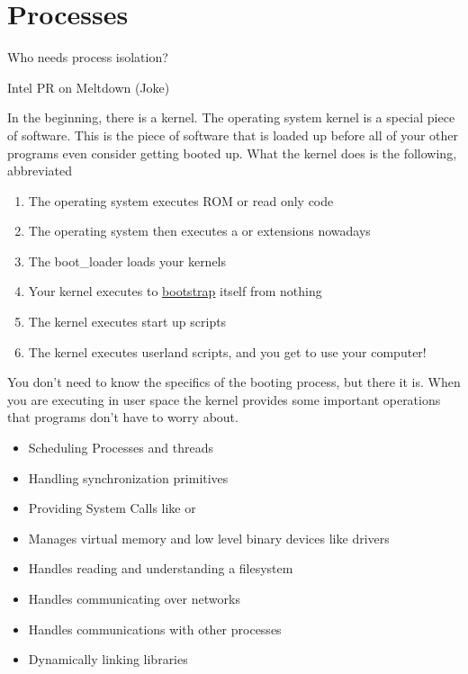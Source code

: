 \chapter{Processes}

\epigraph{Who needs process isolation?}{Intel PR on Meltdown (Joke)}

\begin{aside}
In the beginning, there is a kernel. The operating system kernel is a special piece of software. This is the piece of software that is loaded up before all of your other programs even consider getting booted up. What the kernel does is the following, abbreviated

\begin{enumerate}
\def\labelenumi{\arabic{enumi}.}
\tightlist
\item
  The operating system executes ROM or read only code
\item
  The operating system then executes a  or  extensions nowadays
\item
  The boot\_loader loads your kernels
\item
  Your kernel executes  to \href{https://en.wikipedia.org/wiki/Bootstrapping}{bootstrap} itself from nothing
\item
  The kernel executes start up scripts
\item
  The kernel executes userland scripts, and you get to use your computer!
\end{enumerate}
\end{aside}

You don't need to know the specifics of the booting process, but there it is. When you are executing in user space the kernel provides some important operations that programs don't have to worry about. 

\begin{itemize}
\item Scheduling Processes and threads
\item Handling synchronization primitives 
\item Providing System Calls like  or  
\item Manages virtual memory and low level binary devices like  drivers 
\item Handles reading and understanding a filesystem 
\item Handles communicating over networks 
\item Handles communications with other processes 
\item Dynamically linking libraries
\end{itemize}

